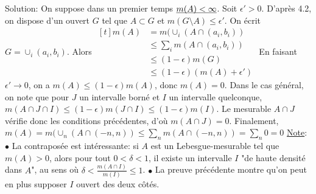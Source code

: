 \documentclass{report}
\begin{document}
Solution: On suppose dans un premier temps $\underline{\smash{m(A)<\infty}}$. \newline Soit $\epsilon' >0$. D'après 4.2, on dispose d'un ouvert $G$ tel que $A\subset G$ et $m(G\setminus A)\leq \epsilon'$. \newline On écrit $G = \cup_i (a_i,b_i)$. Alors $\begin{aligned}[t] m(A) &= m(\cup_i (A\cap (a_i,b_i))\\ &\leq \sum_i m(A\cap (a_i,b_i)) \\ &\leq (1-\epsilon) m(G) \\ &\leq (1-\epsilon)(m(A) + \epsilon') \end{aligned}$\newline 
En faisant $\epsilon' \to 0$, on a $m(A) \leq (1-\epsilon)m(A)$, donc $m(A) = 0$.\newline \newline
Dans le cas général, on note que pour $J$ un intervalle borné et $I$  un intervalle quelconque, $m(A\cap J \cap I) \leq (1-\epsilon)m(J\cap I) \leq (1-\epsilon)m(I)$. \newline Le mesurable $A\cap J$ vérifie donc les conditions précédentes, d'où $m(A\cap J)=0$. \newline
Finalement, $m(A) = m(\cup_n (A\cap (-n,n))\leq \sum_n m(A\cap (-n,n)) = \sum_n 0 = 0$ \newline \newline
\underline{Note}: $\bullet$ La contraposée est intéressante: si $A$ est un Lebesgue-mesurable tel que $m(A)>0$, alors pour tout $0<\delta<1$, il existe un intervalle $I$ "de haute densité dans $A$", au sens où $\delta < \frac{m(A\cap I)}{m(I)}\leq 1$. \newline 
$\bullet$ La preuve précédente montre qu'on peut en plus supposer $I$ ouvert des deux côtés.

\subsection{}  \\ \\
\end{document}
